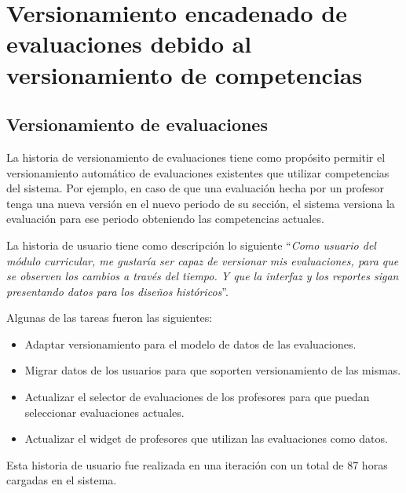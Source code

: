 \section{Versionamiento encadenado de evaluaciones debido al versionamiento de competencias}
\begin{table}[H]
\centering
\caption{Historias de usuario para el versionamiento encadenado de evaluaciones debido al versionamiento de competencias}
\label{epic:5}
\end{table}

\subsection{Versionamiento de evaluaciones}
La historia de versionamiento de evaluaciones tiene como propósito permitir el versionamiento automático de evaluaciones existentes que utilizar competencias del sistema. Por ejemplo, en caso de que una evaluación hecha por un profesor tenga una nueva versión en el nuevo periodo de su sección, el sistema versiona la evaluación para ese periodo obteniendo las competencias actuales.

La historia de usuario tiene como descripción lo siguiente \enquote{\textit{Como usuario del módulo curricular, me gustaría ser capaz de versionar mis evaluaciones, para que se observen los cambios a través del tiempo. Y que la interfaz y los reportes sigan presentando datos para los diseños históricos}}.

Algunas de las tareas fueron las siguientes:
\begin{itemize}
	\item Adaptar versionamiento para el modelo de datos de las evaluaciones.
	\item Migrar datos de los usuarios para que soporten versionamiento de las mismas.
	\item Actualizar el selector de evaluaciones de los profesores para que puedan seleccionar evaluaciones actuales.
	\item Actualizar el widget de profesores que utilizan las evaluaciones como datos.
\end{itemize}

Esta historia de usuario fue realizada en una iteración con un total de 87 horas cargadas en el sistema.
